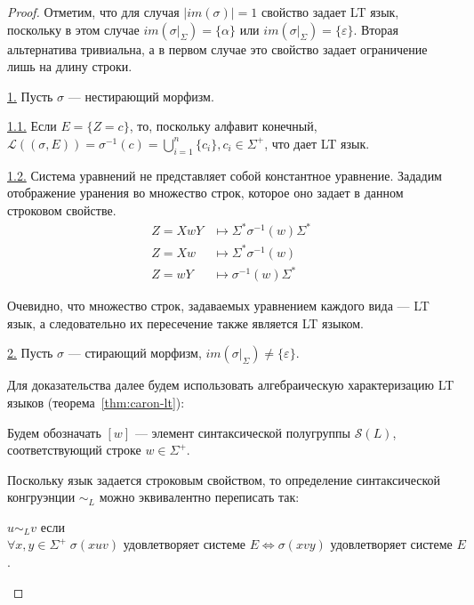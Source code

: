 \documentclass[fontsize=14pt]{scrartcl}
\newcommand{\Lang}{\mathcal{L}}
\begin{document}
\begin{proof}
    Отметим, что для случая $|im(\sigma)| = 1$ свойство задает LT язык, поскольку в этом случае $im(\sigma|_{\Sigma}) = \{\alpha\}$ или $im(\sigma|_{\Sigma}) = \{\varepsilon\}$.
    Вторая альтернатива тривиальна, а в первом случае это свойство задает ограничение лишь на длину строки.

    \underline{1.} Пусть $\sigma$ --- нестирающий морфизм. 

    \underline{1.1.} Если $E = \{Z = c\}$, то, поскольку алфавит конечный, $\Lang((\sigma, E)) = \sigma^{-1}(c) = \bigcup_{i=1}^n \{c_i\}, c_i \in \Sigma^+$, что дает LT язык.

    \underline{1.2.} Система уравнений не представляет собой константное уравнение. 
    Зададим отображение уранения во множество строк, которое оно задает в данном строковом свойстве.
    \begin{align*}
        Z = X w Y &\mapsto \Sigma^* \sigma^{-1}(w) \Sigma^* \\
        Z = X w &\mapsto \Sigma^* \sigma^{-1}(w) \\
        Z = w Y &\mapsto \sigma^{-1}(w) \Sigma^*
    \end{align*}


    Очевидно, что множество строк, задаваемых уравнением каждого вида --- LT язык, а следовательно их пересечение также является LT языком.

    \underline{2.} Пусть $\sigma$ --- стирающий морфизм, $im(\sigma|_{\Sigma}) \neq \{\varepsilon\}$.

    Для доказательства далее будем использовать алгебраическую характеризацию LT языков (теорема~\ref{thm:caron-lt}):

    Будем обозначать $[w]$ --- элемент синтаксической полугруппы $\mathcal{S}(L)$, соответствующий строке $w \in \Sigma^+$. 
    
    Поскольку язык задается строковым свойством, то определение синтаксической конгруэнции $\sim_L$ можно эквивалентно переписать так:
    \begin{center}
    $u \sim_L v$ если $ \forall x, y \in \Sigma^+ \; \sigma(xuv) \text{ удовлетворяет системе } E \iff \sigma(xvy) \text{ удовлетворяет системе } E$.
    \end{center}


\end{proof}
\end{document}
